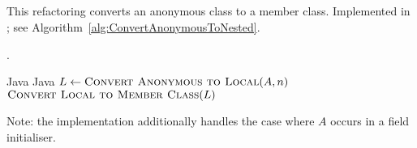 \subsection{}
This refactoring converts an anonymous class to a member class. Implemented in ; see Algorithm~\ref{alg:ConvertAnonymousToNested}.


\begin{algorithm}
\caption{$\refactoring{Convert Anonymous to Nested}(A : \type{AnonymousClass}, n : \type{Name}) : \type{MemberType}$}\label{alg:ConvertAnonymousToNested}.
\begin{algorithmic}[1]
\REQUIRE Java
\ENSURE Java
\medskip
\STATE $L \leftarrow \textsc{Convert Anonymous to Local}(A, n)$
\RETURN $\textsc{Convert Local to Member Class}(L)$
\end{algorithmic}
\end{algorithm}

Note: the implementation additionally handles the case where $A$ occurs in a field initialiser.

